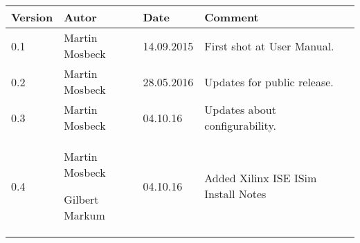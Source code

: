 
\begin{table}[h]
\begin{tabular*}{14.7cm}{|p{}|p{}|p{2cm}|p{}|}
\hline 
Version & Autor & Date & Comment \\[2pt]
\hline
\hline

0.1 & Martin Mosbeck & 14.09.2015 & First shot at User Manual. \\[2pt]
\hline 
0.2 & Martin Mosbeck & 28.05.2016 & Updates for public release. \\[2pt]
\hline 
0.3 & Martin Mosbeck & 04.10.16 & Updates about configurability. \\[2pt]
\hline 
0.4 & Martin Mosbeck \par Gilbert Markum & 04.10.16 & Added Xilinx ISE ISim Install Notes \\[2pt]
\hline 
\end{tabular*}
\end{table}

